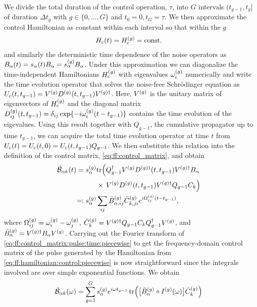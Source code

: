 We divide the total duration of the control operation, $\tau$, into $G$ intervals $(t_{g-1}, t_{g}]$ of duration $\Delta t_g$ with $g\in\lbrace 0,\dotsc,G\rbrace$ and $t_0 =  0, t_G = \tau$.
We then approximate the control Hamiltonian as constant within each interval so that within the $g$
\begin{align}\label{eq:ff:hamiltonian:control:piecewise}
H_{\mathrm{c}}(t) = H_{\mathrm{c}}^{(g)} = \mathrm{const.}
\end{align}
and similarly the deterministic time dependence of the noise operators as $B_\alpha(t) = s_\alpha(t)B_\alpha = s_\alpha^{(g)}B_\alpha$.
Under this approximation we can diagonalize the time-independent Hamiltonians $H_{\mathrm{c}}^{(g)}$ with eigenvalues $\omega_i^{(g)}$ numerically and write the time evolution operator that solves the noise-free Schr\"odinger equation as $U_{\mathrm{c}}(t, t_{g-1}) = V^{(g)} D^{(g)}(t, t_{g-1})V^{(g)\dagger}$.
Here, $V^{(g)}$ is the unitary matrix of eigenvectors of $H_{\mathrm{c}}^{(g)}$ and the diagonal matrix $D_{ij}^{(g)}(t, t_{g-1}) = \delta_{ij}\exp\{-i\omega_i^{(g)}(t - t_{g-1})\}$ contains the time evolution of the eigevalues.
Using this result together with $Q_{g-1}$, the cumulative propagator up to time $t_{g-1}$, we can acquire the total time evolution operator at time $t$ from $U_{\mathrm{c}}(t) = U_{\mathrm{c}}(t,0) = U_{\mathrm{c}}(t, t_{g-1}) Q_{g-1}$.
We then substitute this relation into the definition of the control matrix, \cref{eq:ff:control_matrix}, and obtain
\begin{align}
    \tilde{\mathcal{B}}_{\alpha k}(t) = s_\alpha^{(g)}&\mathrm{tr}\Bigl(Q_{g-1}^\dagger V^{(g)} D^{(g)\dagger}(t, t_{g-1}) V^{(g)\dagger} B_\alpha \notag\\
    &      \times\,V^{(g)} D^{(g)}(t, t_{g-1})V^{(g)\dagger} Q_{g-1} C_k\Bigr) \\
    \eqqcolon s_\alpha^{(g)}&\sum_{ij}\bar{B}_{\alpha,ij}^{(g)}\bar{C}_{k,ji}^{(g)}
    e^{i\Omega_{ij}^{(g)}(t - t_{g-1})}, \label{eq:ff:control_matrix:pulse:time:piecewise}
\end{align}
where $\Omega_{ij}^{(g)} = \omega_i^{(g)} - \omega_j^{(g)}$, $\bar{C}_{k}^{(g)} = V^{(g)\dagger} Q_{g-1} C_k Q_{g-1}^\dagger V^{(g)}$, and $\bar{B}_{\alpha}^{(g)} = V^{(g)\dagger} B_\alpha V^{(g)}$.
Carrying out the Fourier transform of \cref{eq:ff:control_matrix:pulse:time:piecewise} to get the frequency-domain control matrix of the pulse generated by the Hamiltonian from \cref{eq:ff:hamiltonian:control:piecewise} is now straightforward since the integrals involved are over simple exponential functions.
We obtain
\begin{equation}\label{eq:ff:control_matrix:pulse:freq:ff:calculation}
\tilde{\mathcal{B}}_{\alpha k}(\omega) = \sum_{g = 1}^G s_\alpha^{(g)}e^{i\omega t_{g-1}}\tr(\bigl[\bar{B}_\alpha^{(g)}\circ I^{(g)}(\omega)\bigr]\bar{C}_k^{(g)})
\end{equation}
